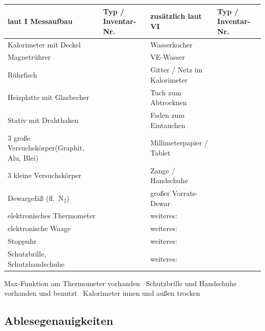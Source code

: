 \documentclass{article}
\newcommand{\zhs}{\rule[-2mm]{0pt}{7mm}}
\newcommand{\ak}{\raisebox{-0.4ex}{\setlength{\fboxsep}{0pt}\framebox[3.2mm]{\rule{0pt}{3.2mm}}}\,}
\newenvironment{tblock}{\par\noindent\begin{minipage}{\linewidth}}{\end{minipage}\par}
\begin{document}
\begin{tblock}
  {\footnotesize
  \begin{tabular}{|L{3.7cm}|L{3.2cm}||L{3.7cm}|L{3.2cm}|}
    \hline
    \zhs\textbf{laut I Messaufbau} & \textbf{Typ / Inventar-Nr.}
      & \textbf{zus\"atzlich laut VI} & \textbf{Typ / Inventar-Nr.} \\
    \hline\hline
    \zhs Kalorimeter mit Deckel & & Wasserkocher & \\ \hline
    \zhs Magnetr\"uhrer & & VE-Wasser & \\ \hline
    \zhs R\"uhrfisch & & Gitter / Netz im Kalorimeter & \\ \hline
    \zhs Heizplatte mit Glasbecher & & Tuch zum Abtrocknen & \\ \hline
    \zhs Stativ mit Drahthaken & & Faden zum Eintauchen & \\ \hline
    \zhs 3 gro\ss{}e Versuchsk\"orper\newline (Graphit, Alu, Blei) & & Millimeterpapier / Tablet & \\ \hline
    \zhs 3 kleine Versuchsk\"orper & & Zange / Handschuhe & \\ \hline
    \zhs Dewargef\"a\ss{} (fl.\ N$_2$) & & gro\ss{}er Vorrats-Dewar & \\ \hline
    \zhs elektronisches Thermometer & & weiteres: & \\ \hline
    \zhs elektronische Waage & & weiteres: & \\ \hline
    \zhs Stoppuhr & & weiteres: & \\ \hline
    \zhs Schutzbrille, Schutzhandschuhe & & weiteres: & \\ \hline
  \end{tabular}}

  \vspace{2mm}
  Max-Funktion am Thermometer vorhanden \ak \quad
  Schutzbrille und Handschuhe vorhanden und benutzt \ak \quad
  Kalorimeter innen und au\ss{}en trocken \ak
\end{tblock}

\subsection*{Ablesegenauigkeiten}
\end{document}
